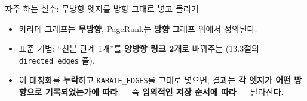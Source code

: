 \begin{frame}{자주 하는 실수: 무방향 엣지를 방향 그대로 넣고 돌리기}
  \begin{itemize}
    \item 카라테 그래프는 \textbf{무방향}, PageRank는
      \textbf{방향} 그래프 위에서 정의된다.
    \item 표준 기법: ``친분 관계 1개''를 \textbf{양방향 링크 2개}로
      바꿔주는  (13.3절의 \texttt{directed\_edges} 줄).
    \item 이 대칭화를 \textbf{누락}하고 \texttt{KARATE\_EDGES}를
      그대로 넣으면, 결과는 \textbf{각 엣지가 어떤 방향으로
      기록되었는가에 따라} --- 즉 \textbf{임의적인 저장 순서에 따라}
      --- 달라진다.
  \end{itemize}
\end{frame}
